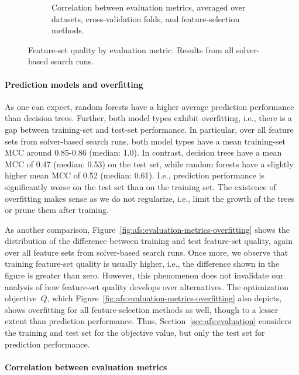\documentclass{article}
\theoremstyle{definition}
\begin{document}
\begin{figure}[t]
\begin{subfigure}[t]{0.48\textwidth}
		\caption{Correlation between evaluation metrics, averaged over datasets, cross-valida\-tion folds, and feature-selection methods.}
		\label{fig:afs:evaluation-metrics-correlation}
	\end{subfigure}
	\caption{
		Feature-set quality by evaluation metric.
		Results from all solver-based search runs.
	}
	\label{fig:afs:evaluation-metrics}
\end{figure}

\paragraph{Prediction models and overfitting}

As one can expect, random forests have a higher average prediction performance than decision trees.
Further, both model types exhibit overfitting, i.e., there is a gap between training-set and test-set performance.
In particular, over all feature sets from solver-based search runs, both model types have a mean training-set MCC around 0.85-0.86 (median: 1.0).
In contrast, decision trees have a mean MCC of 0.47 (median: 0.53) on the test set, while random forests have a slightly higher mean MCC of 0.52 (median: 0.61).
I.e., prediction performance is significantly worse on the test set than on the training set.
The existence of overfitting makes sense as we do not regularize, i.e., limit the growth of the trees or prune them after training.

As another comparison, Figure~\ref{fig:afs:evaluation-metrics-overfitting} shows the distribution of the difference between training and test feature-set quality, again over all feature sets from solver-based search runs.
Once more, we observe that training feature-set quality is usually higher, i.e., the difference shown in the figure is greater than zero.
However, this phenomenon does not invalidate our analysis of how feature-set quality develops over alternatives.
The optimization objective~$Q$, which Figure~\ref{fig:afs:evaluation-metrics-overfitting} also depicts, shows overfitting for all feature-selection methods as well, though to a lesser extent than prediction performance.
Thus, Section~\ref{sec:afs:evaluation} considers the training and test set for the objective value, but only the test set for prediction performance.

\paragraph{Correlation between evaluation metrics}
\end{document}
